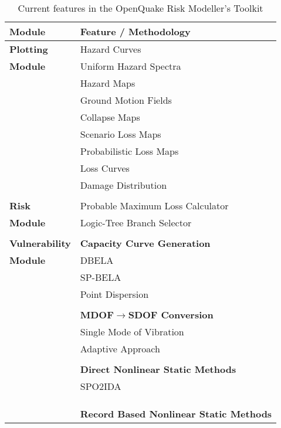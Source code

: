 \begin{table}[!htbp]
\caption{Current features in the OpenQuake Risk Modeller's Toolkit}
\centering
\begin{tabular}{|l|l|} \hline
\textbf{Module}     & \textbf{Feature / Methodology} \\ \hline
\textbf{Plotting}   & Hazard Curves \\
\textbf{Module}     & Uniform Hazard Spectra \\
                    & Hazard Maps \\
                    & Ground Motion Fields \\
                    & Collapse Maps \\
                    & Scenario Loss Maps \\
                    & Probabilistic Loss Maps \\
                    & Loss Curves \\
                    & Damage Distribution \\
                    & \\ \hline
\textbf{Risk}       & Probable Maximum Loss Calculator \\
\textbf{Module}     & Logic-Tree Branch Selector \\
                    & \\ \hline
\textbf{Vulnerability} & \textbf{Capacity Curve Generation} \\
\textbf{Module}        & DBELA \\
                    & SP-BELA \\
                    & Point Dispersion \\
                    & \\
                    & \textbf{MDOF$\to$SDOF Conversion} \\
                    & Single Mode of Vibration \\
                    & Adaptive Approach \\
                    & \\
                    & \textbf{Direct Nonlinear Static Methods} \\
                    & SPO2IDA \citep{VamvatsikosCornell2005} \\
                    & \citet{DolsekFajfar2004} \\
                    & \citet{RuizGarciaMiranda2007} \\
                    & \\
                    & \textbf{Record Based Nonlinear Static Methods} \\

\end{tabular}
\end{table}
